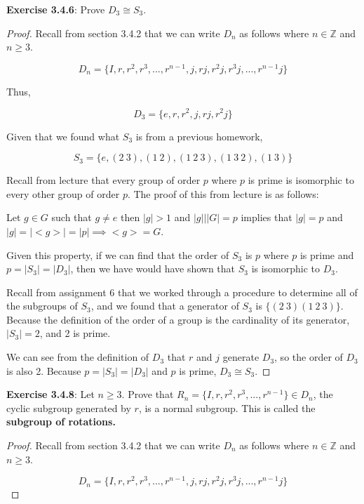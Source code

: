 \documentclass[a4paper]{article}
\begin{document}
\begin{myparindent}{0pt}
\textbf{Exercise 3.4.6}:
Prove $D_3 \cong S_3$.
\begin{proof}
  Recall from section 3.4.2 that we can write $D_n$ as follows where
  $n \in \mathbb{Z}$ and $n \ge 3$.

  \[ D_n = \{I, r, r^2, r^3,..., r^{n-1},j,rj, r^2 j, r^3 j,..., r^{n-1} j \} \]

  Thus,

  \[ D_3 = \{ e, r, r^2, j, rj, r^2j \} \]

  Given that we found what $S_3$ is from a previous homework,

  \[ S_3 = \{ e, (2 ~3), (1 ~2), (1 ~2 ~3), (1 ~3 ~2), (1 ~3) \} \]

  Recall from lecture that every group of order $p$ where $p$ is prime is
  isomorphic to every other group of order $p$. The proof of this from lecture
  is as follows:

  Let $g \in G$ such that $g \neq e$ then $|g| > 1$ and $|g| \vert |G| = p$
  implies that $|g| = p$ and $|g| = |<g>| = |p| \implies <g> = G$. \newline

  Given this property, if we can find that the order of $S_3$ is $p$ where $p$
  is prime and $p = |S_3| = |D_3|$, then we have would have shown that $S_3$ is
  isomorphic to $D_3$. \newline

  Recall from assignment 6 that we worked through a
  procedure to determine all of the subgroups of $S_3$, and we found that a
  generator of $S_3$ is $\{ (2 ~3) (1 ~2 ~3)\}$. Because the definition of the
  order of a group is the cardinality of its generator, $|S_3| = 2$, and 2 is
  prime.
  \newline

  We can see from the definition of $D_3$ that $r$ and $j$ generate $D_3$, so
  the order of $D_3$ is also 2. Because $p = |S_3| = |D_3|$ and $p$ is prime,
  $D_3 \cong S_3$.

\end{proof}

\textbf{Exercise 3.4.8}:
Let $n \ge 3$. Prove that $R_n = \{ I, r, r^2, r^3, ..., r^{n - 1} \} \in D_n$,
the cyclic subgroup generated by $r$, is a normal subgroup. This is called the
\textbf{subgroup of rotations.}
\begin{proof}
  Recall from section 3.4.2 that we can write $D_n$ as follows where
  $n \in \mathbb{Z}$ and $n \ge 3$.

  \[ D_n = \{I, r, r^2, r^3,..., r^{n-1},j,rj, r^2 j, r^3 j,..., r^{n-1} j \} \]


\end{proof}
\end{myparindent}
\end{document}

